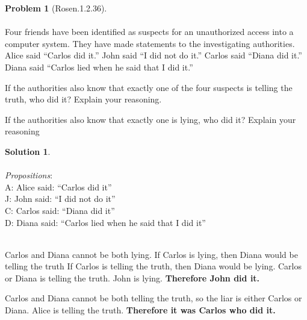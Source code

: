 \documentclass{article}
\theoremstyle{definition}
\newtheorem*{problem}{Problem}
\newtheorem*{solution}{Solution}
\begin{document}
\begin{problem}[Rosen.1.2.36]\ \\
\ \\
Four friends have been identified as suspects for an unauthorized
access into a computer system. They have made
statements to the investigating authorities. Alice said
“Carlos did it.” John said “I did not do it.” Carlos said
“Diana did it.” Diana said “Carlos lied when he said that
I did it.”\ \\
\begin{compactenum}
\renewcommand{\theenumi}{\alph{enumi}}
\item If the authorities also know that exactly one of the
four suspects is telling the truth, who did it? Explain
your reasoning.
\item If the authorities also know that exactly one is lying,
who did it? Explain your reasoning
\end{compactenum}
\end{problem}

\begin{solution}\ \\
\ \\
\textit{Propositions}:\ \\
A: Alice said: “Carlos did it”\ \\
J: John said: “I did not do it”\ \\
C: Carlos said: “Diana did it”\ \\
D: Diana said: “Carlos lied when he said that I did it”\ \\
\ \\
\begin{compactenum}
\renewcommand{\theenumi}{\alph{enumi}}  
\item Carlos and Diana cannot be both lying. If Carlos is lying, then Diana would be telling the truth If Carlos is telling the truth, then Diana would be lying. Carlos or Diana is telling the truth. John is lying. \textbf{Therefore John did it.}
\ \\
\item Carlos and Diana cannot be both telling the truth, so the liar is either Carlos or Diana. Alice is telling the truth. \textbf{Therefore it was Carlos who did it.}

\end{compactenum}
\end{solution}
\end{document}
